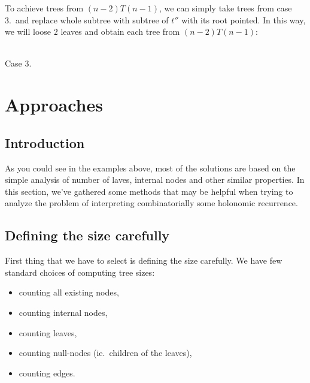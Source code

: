 \documentclass[final]{article}
\theoremstyle{definition}
\theoremstyle{remark}
\begin{document}
To achieve trees from \((n - 2) T(n - 1)\), we can simply take trees from case 3.\ and replace whole subtree with subtree of \(t''\) with its root pointed. In this way, we will loose \(2\) leaves and obtain each tree from \((n - 2) T(n - 1)\):

\begin{center}
    \begin{minipage}[t]{.3\textwidth}
        \begin{center}
            \\
            Case 3.
        \end{center}
    \end{minipage}%
\end{center}

\section{Approaches}%
\label{sec:approaches}

\subsection{Introduction}%
\label{sub:introduction}

As you could see in the examples above, most of the solutions are based on the simple analysis of number of laves, internal nodes and other similar properties. In this section, we've gathered some methods that may be helpful when trying to analyze the problem of interpreting combinatorially some holonomic recurrence.

\subsection{Defining the size carefully}%
\label{sub:defining_the_size_carefully}

First thing that we have to select is defining the size carefully. We have few standard choices of computing tree sizes:
\begin{itemize}
    \item counting all existing nodes,
    \item counting internal nodes,
    \item counting leaves,
    \item counting null-nodes (ie.\ children of the leaves),
    \item counting edges.
\end{itemize}
\end{document}
